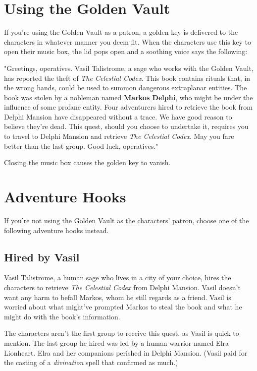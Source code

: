 \documentclass[10pt,a4paper,twoside,bg=print,twocolumn,openany,nodeprecatedcode]{dndbook}
\begin{document}
\section{Using the Golden Vault}
If you're using the Golden Vault as a patron, a golden key is delivered to the characters in whatever manner you deem fit. When the characters use this key to open their music box, the lid pops open and a soothing voice says the following:

\begin{DndReadAloud}{}
"Greetings, operatives. Vasil Talistrome, a sage who works with the Golden Vault, has reported the theft of \textit{The Celestial Codex}. This book contains rituals that, in the wrong hands, could be used to summon dangerous extraplanar entities. The book was stolen by a nobleman named \textbf{Markos Delphi}, who might be under the influence of some profane entity. Four adventurers hired to retrieve the book from Delphi Mansion have disappeared without a trace. We have good reason to believe they're dead. This quest, should you choose to undertake it, requires you to travel to Delphi Mansion and retrieve \textit{The Celestial Codex}. May you fare better than the last group. Good luck, operatives."

\end{DndReadAloud}

Closing the music box causes the golden key to vanish.

\section{Adventure Hooks}
If you're not using the Golden Vault as the characters' patron, choose one of the following adventure hooks instead.

\subsection{Hired by Vasil}
Vasil Talistrome, a human sage who lives in a city of your choice, hires the characters to retrieve \textit{The Celestial Codex} from Delphi Mansion. Vasil doesn't want any harm to befall Markos, whom he still regards as a friend. Vasil is worried about what might've prompted Markos to steal the book and what he might do with the book's information.

The characters aren't the first group to receive this quest, as Vasil is quick to mention. The last group he hired was led by a human warrior named Elra Lionheart. Elra and her companions perished in Delphi Mansion. (Vasil paid for the casting of a \textit{divination} spell that confirmed as much.)
\end{document}
